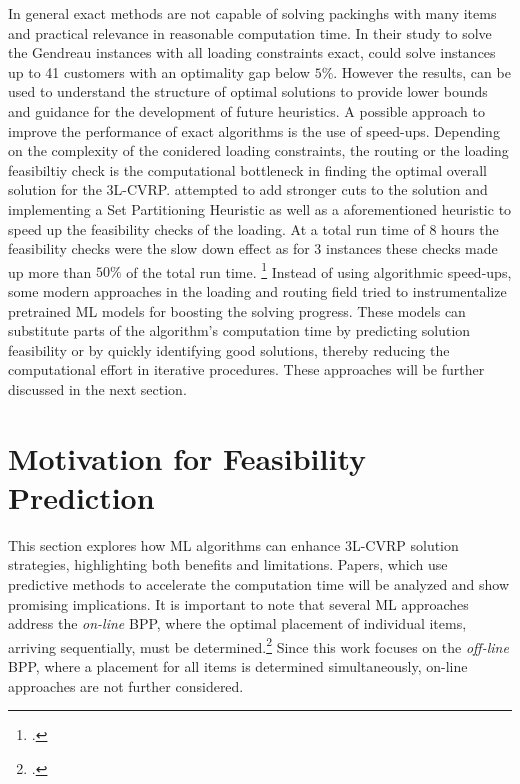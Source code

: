 In general exact methods are not capable of solving packinghs with many items and practical relevance
in reasonable computation time. In their study to solve the Gendreau instances with all loading constraints exact,
\cite{tamke_branch-and-cut_2024} could solve instances up to 41 customers with an optimality
gap below $5 \%$. However the results, can be used to understand the structure
of optimal solutions to provide lower bounds and guidance for the development of future
heuristics. A possible approach to improve
the performance of exact algorithms is the use of speed-ups. Depending on the complexity of
the conidered loading constraints, the routing or the loading feasibiltiy check is the computational
bottleneck in finding the optimal overall solution for the \gls{3L-CVRP}. \cite{tamke_branch-and-cut_2024} attempted to add
stronger cuts to the solution and implementing a Set Partitioning Heuristic as well as a
aforementioned heuristic to speed up the feasibility checks of the loading. At a total run time of 8 hours the feasibility
checks were the slow down effect as for 3 instances these checks made up more than $50\%$ of the total run time. \footcite[cf.][p.2]{tamke_branch-and-cut_2024}
Instead of using algorithmic speed-ups, some modern approaches in the loading and routing field tried
to instrumentalize pretrained \gls{ML} models for boosting the solving progress.
These models can substitute parts of the algorithm's computation time by predicting solution
feasibility or by quickly identifying good solutions, thereby reducing the computational effort
in iterative procedures. These approaches will be further discussed in the next section.

\section{Motivation for Feasibility Prediction}
\label{sec:motivation_feasibility_prediction}
This section explores how \gls{ML} algorithms can enhance \gls{3L-CVRP} solution strategies,
highlighting both benefits and limitations. Papers, which use predictive methods to accelerate the computation time
will be analyzed and show promising implications. It is important to note that
several \gls{ML} approaches address the \textit{on-line} \gls{BPP}, where the optimal placement
of individual items, arriving sequentially, must be determined.\footcite[cf.][p.1]{ali_-line_2022}
Since this work focuses on the \textit{off-line} \gls{BPP}, where a placement for all items is determined
simultaneously, on-line approaches are not further considered.

